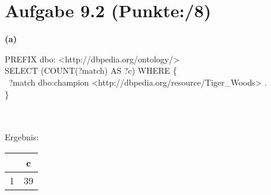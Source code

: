 \documentclass[11pt, a4paper]{article}
\newcommand{\blattnummer}{9}
\newcommand{\pp}{8}
\newcommand{\aufgabe}[2] {\section*{Aufgabe \blattnummer.#1 (Punkte:\qquad/#2)}}
\newcommand{\aufgabenteil}[1] {\textbf{(#1)}}
\begin{document}
\aufgabe{2}{\pp}
\aufgabenteil{a}
\begin{adjustwidth}{20pt}{20pt}
\begin{tt}
PREFIX dbo:  <http://dbpedia.org/ontology/>\\
SELECT (COUNT(?match) AS ?c) WHERE \{\\
\null\qquad\ ?match dbo:champion <http://dbpedia.org/resource/Tiger\_Woods> .\\
\}
\end{tt}
\\ \ \\
Ergebnis:\\
\begin{tabular}{ |c|c| } 
 \hline
 &c\\ 
 \hline
 1&39\\
 \hline
\end{tabular} \ \\
\end{adjustwidth}
\end{document}
